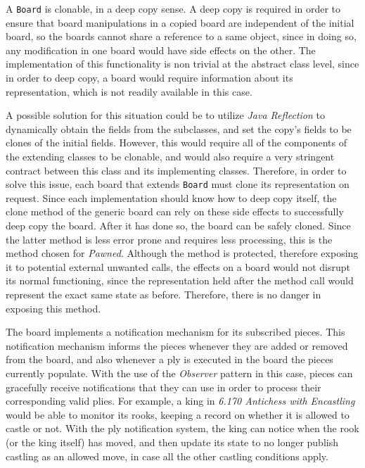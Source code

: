 												A \texttt{Board} is clonable, in a deep copy sense. A deep copy is required in order
												to ensure that board manipulations in a copied board are independent of the initial 
												board, so the boards cannot share a reference to a same object, since in doing so, 
												any modification in one board would have side effects on the other. The implementation of this 
												functionality is non trivial at the abstract class level, 
												since in order to deep copy, a board would require information 
												about its representation, which is not readily available in this case. 
												
												A possible solution for this situation could be to utilize \emph{Java Reflection} to dynamically
												obtain the fields from the subclasses, and set the copy's fields to be clones of the initial fields.
												However, this would require all of the components of the extending classes to be clonable, and would
												also require a very stringent contract between this class and its implementing classes. Therefore, 
												in order to solve this issue, each board that extends \texttt{Board} must clone its representation 
												on request. Since each implementation should know how to deep copy itself, the clone method
												of the generic board can rely on these side effects to successfully deep copy the board. 
												After it has done so, the board can be safely cloned. Since the latter method is less error prone and
												requires less processing, this is the method chosen for \emph{Pawned}. Although the method is
												protected, therefore exposing it to potential external unwanted calls, the effects on a board
												would not disrupt its normal functioning, since the representation held after the method call would 
												represent the exact same state as before. Therefore, there is no danger in exposing this method. 
												
												The board implements a notification mechanism for its subscribed pieces. This notification mechanism
												informs the pieces whenever they are added or removed from the board, and also whenever a ply is 
												executed in the board the pieces currently populate. With the use of the \emph{Observer} pattern 
												in this case, pieces can gracefully receive notifications that they can use in order to process
												their corresponding valid plies. For example, a king in \emph{6.170 Antichess with Encastling}
												would be able to monitor its rooks, keeping a record on whether it is allowed to castle or not. 
												With the ply notification system, the king can notice when the rook (or the king itself) has
												moved, and then update its state to no longer publish castling as an allowed move, in case
												all the other castling conditions apply. 
												
